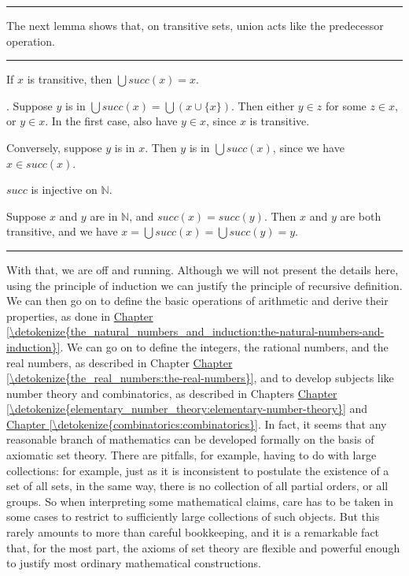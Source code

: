 \documentclass[letterpaper,10pt,english]{sphinxmanual}
\begin{document}
\bigskip\hrule\bigskip


\sphinxAtStartPar
The next lemma shows that, on transitive sets, union acts like the predecessor operation.


\bigskip\hrule\bigskip


\sphinxAtStartPar
{} If \(x\) is transitive, then \(\bigcup \mathit{succ}(x) = x\).

\sphinxAtStartPar
{}. Suppose \(y\) is in \(\bigcup \mathit{succ}(x) = \bigcup (x \cup \{ x \})\). Then either \(y \in z\) for some \(z \in x\), or \(y \in x\). In the first case, also have \(y \in x\), since \(x\) is transitive.

\sphinxAtStartPar
Conversely, suppose \(y\) is in \(x\). Then \(y\) is in \(\bigcup \mathit{succ}(x)\), since we have \(x \in \mathit{succ}(x)\).

\sphinxAtStartPar
{} \(\mathit{succ}\) is injective on \(\mathbb{N}\).

\sphinxAtStartPar
{} Suppose \(x\) and \(y\) are in \(\mathbb{N}\), and \(\mathit{succ}(x) = \mathit{succ}(y)\). Then \(x\) and \(y\) are both transitive, and we have \(x = \bigcup \mathit{succ}(x) = \bigcup \mathit{succ}(y) = y\).


\bigskip\hrule\bigskip


\sphinxAtStartPar
With that, we are off and running. Although we will not present the details here, using the principle of induction we can justify the principle of recursive definition. We can then go on to define the basic operations of arithmetic and derive their properties, as done in \hyperref[\detokenize{the_natural_numbers_and_induction:the-natural-numbers-and-induction}]{Chapter \ref{\detokenize{the_natural_numbers_and_induction:the-natural-numbers-and-induction}}}. We can go on to define the integers, the rational numbers, and the real numbers, as described in Chapter \hyperref[\detokenize{the_real_numbers:the-real-numbers}]{Chapter \ref{\detokenize{the_real_numbers:the-real-numbers}}}, and to develop subjects like number theory and combinatorics, as described in Chapters \hyperref[\detokenize{elementary_number_theory:elementary-number-theory}]{Chapter \ref{\detokenize{elementary_number_theory:elementary-number-theory}}} and \hyperref[\detokenize{combinatorics:combinatorics}]{Chapter \ref{\detokenize{combinatorics:combinatorics}}}. In fact, it seems that any reasonable branch of mathematics can be developed formally on the basis of axiomatic set theory. There are pitfalls, for example, having to do with large collections: for example, just as it is inconsistent to postulate the existence of a set of all sets, in the same way, there is no collection of all partial orders, or all groups. So when interpreting some mathematical claims, care has to be taken in some cases to restrict to sufficiently large collections of such objects. But this rarely amounts to more than careful bookkeeping, and it is a remarkable fact that, for the most part, the axioms of set theory are flexible and powerful enough to justify most ordinary mathematical constructions.
\end{document}
